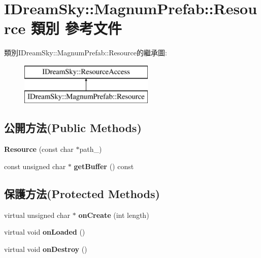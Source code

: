 \hypertarget{class_i_dream_sky_1_1_magnum_prefab_1_1_resource}{}\section{I\+Dream\+Sky\+:\+:Magnum\+Prefab\+:\+:Resource 類別 參考文件}
\label{class_i_dream_sky_1_1_magnum_prefab_1_1_resource}
類別\+I\+Dream\+Sky\+:\+:Magnum\+Prefab\+:\+:Resource的繼承圖\+:\begin{figure}[H]
\begin{center}
\leavevmode
\includegraphics[height=2.000000cm]{class_i_dream_sky_1_1_magnum_prefab_1_1_resource}
\end{center}
\end{figure}
\subsection*{公開方法(Public Methods)}
\begin{DoxyCompactItemize}
\item 
{\bfseries Resource} (const char $\ast$path\+\_\+)\hypertarget{class_i_dream_sky_1_1_magnum_prefab_1_1_resource_a95f702481d7895cfa92aa8f89d622db7}{}\label{class_i_dream_sky_1_1_magnum_prefab_1_1_resource_a95f702481d7895cfa92aa8f89d622db7}

\item 
const unsigned char $\ast$ {\bfseries get\+Buffer} () const \hypertarget{class_i_dream_sky_1_1_magnum_prefab_1_1_resource_a4e457559d6defadcaa5020706db15576}{}\label{class_i_dream_sky_1_1_magnum_prefab_1_1_resource_a4e457559d6defadcaa5020706db15576}

\end{DoxyCompactItemize}
\subsection*{保護方法(Protected Methods)}
\begin{DoxyCompactItemize}
\item 
virtual unsigned char $\ast$ {\bfseries on\+Create} (int length)\hypertarget{class_i_dream_sky_1_1_magnum_prefab_1_1_resource_abdb9e93170118021522bca9f8d6baa33}{}\label{class_i_dream_sky_1_1_magnum_prefab_1_1_resource_abdb9e93170118021522bca9f8d6baa33}

\item 
virtual void {\bfseries on\+Loaded} ()\hypertarget{class_i_dream_sky_1_1_magnum_prefab_1_1_resource_a772a48c8912c2554830ec74c00a44f89}{}\label{class_i_dream_sky_1_1_magnum_prefab_1_1_resource_a772a48c8912c2554830ec74c00a44f89}

\item 
virtual void {\bfseries on\+Destroy} ()\hypertarget{class_i_dream_sky_1_1_magnum_prefab_1_1_resource_aaade2c8852d1336874beb21a4ea35792}{}\label{class_i_dream_sky_1_1_magnum_prefab_1_1_resource_aaade2c8852d1336874beb21a4ea35792}

\end{DoxyCompactItemize}
